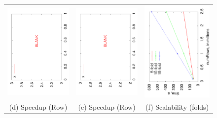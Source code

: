 \documentclass{vldb}
\begin{document}
{\begin{figure}
\begin{tabular}{ccc}
\includegraphics[angle=-90,width=2.3in]{blank.pdf} &
\hspace*{-0.2in}
\includegraphics[angle=-90,width=2.3in]{blank.pdf} &
\hspace*{-0.2in}
\includegraphics[angle=-90,width=2.3in]{kfold.pdf} \\
(d) Speedup (Row) & (e) Speedup (Row) & (f) Scalability (folds) \\



\end{tabular}
\end{figure}}
\end{document}
